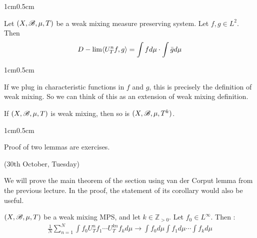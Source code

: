\documentclass[10pt,a4paper]{report}
\newenvironment{proof}
{\begin{changemargin}{1cm}{0.5cm} 
	}%
	{\end{changemargin}
}
\begin{document}
\begin{proof}
\eop
\end{proof}
\s

\lem Let $(X,\mathscr{B}, \mu, T)$ be a weak mixing measure preserving system. Let $f,g\in L^2$. Then
\begin{align*}
D-\lim \langle U^n_T f,g\rangle = \int f d\mu \cdot \int \bar{g} d\mu 
\end{align*}
\begin{proof}
If we plug in characteristic functions in $f$ and $g$, this is precisely the definition of weak mixing. So we can think of this as an extension of weak mixing definition.
\end{proof}

\lem If $(X,\mathscr{B}, \mu, T)$ is weak mixing, then so is $(X,\mathscr{B}, \mu, T^k)$.
\begin{proof}
\pf Proof of two lemmas are exercises.
\end{proof}
\s

\newday

(30th October, Tuesday)
\s

We will prove the main theorem of the section using van der Corput lemma from the previous lecture. In the proof, the statement of its corollary would also be useful.
\s

\cor  $(X,\mathscr{B}, \mu, T)$ be a weak mixing MPS, and let $k\in \mathbb{Z}_{>0}$. Let $f_0 \in L^{\infty}$. Then :
\begin{align*}
\frac{1}{N} \sum_{n=1}^N \int f_0 U^n_T f_1 \cdots U^{kn}_T f_k d\mu \rightarrow \int f_0 d\mu \int f_1 d\mu \cdots \int f_k d\mu
\end{align*}
\s
\end{document}
